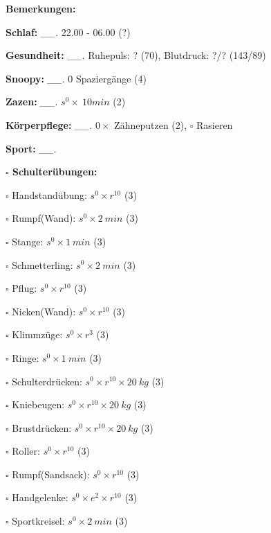 \documentclass[10pt,a4paper]{article}
\newcommand\prop[1] {{\color {alizarin} {\bf #1}}}             %
\newcommand\mand[1] {{\color {burntorange} {\bf #1}}}          %
\newcommand\topspace{\vskip -15pt \hskip 20pt}
\newcommand\n[1] { {\sl #1.} \hskip 5pt }
\begin{document}
\begin{mdframed}[style=daystyle]
  \begin{labeling}{{\mand {Bemerkungen:}}}
    \setlength\itemsep{-3pt}
  \item[{\mand {Schlaf:}}]       \n{\_\_} 22.00 - 06.00 (?)
  \item[{\mand {Gesundheit:}}]   \n{\_\_} Ruhepuls: ? (70), Blutdruck: ?/? (143/89)
  \item[{\mand {Snoopy:}}]       \n{\_\_} 0 Spaziergänge (4)
  \item[{\mand {Zazen:}}]        \n{\_\_} $s^0 \times\ 10 min$ (2)
  \item[{\mand {Körperpflege:}}] \n{\_\_} $0 \times$ Zähneputzen (2), $\square$ Rasieren
  \item[{\mand {Sport:}}]        \n{\_\_}
    \topspace
    \begin{minipage}{0.75\textwidth}  
      \begin{labeling}{\prop {$\square$ {Schulterübungen:}}} 
        \setlength\itemsep{-3pt}
      \item[$\square$ Handstandübung:]  $s^0 \times r^{10}$ (3)
      \item[$\square$ Rumpf(Wand):]     $s^0 \times 2\ min$ (3)
      \item[$\square$ Stange:]          $s^0 \times 1\ min$ (3)
      \item[$\square$ Schmetterling:]   $s^0 \times 2\ min$ (3)
      \item[$\square$ Pflug:]           $s^0 \times r^{10}$ (3)
      \item[$\square$ Nicken(Wand):]    $s^0 \times r^{10}$ (3)
      \item[$\square$ Klimmzüge:]       $s^0 \times r^3$ (3)
      \item[$\square$ Ringe:]           $s^0 \times 1\ min$ (3)
      \item[$\square$ Schulterdrücken:] $s^0 \times r^{10} \times 20\ kg$ (3)
      \item[$\square$ Kniebeugen:]      $s^0 \times r^{10} \times 20\ kg$ (3)
      \item[$\square$ Brustdrücken:]    $s^0 \times r^{10} \times 20\ kg$ (3)
      \item[$\square$ Roller:]          $s^0 \times r^{10}$ (3)
      \item[$\square$ Rumpf(Sandsack):] $s^0 \times r^{10}$ (3)
      \item[$\square$ Handgelenke:]     $s^0 \times e^2 \times r^{10}$ (3)
      \item[$\square$ Sportkreisel:]    $s^0 \times 2\ min$ (3)

\end{labeling}
\end{minipage}
\end{labeling}
\end{mdframed}
\end{document}
